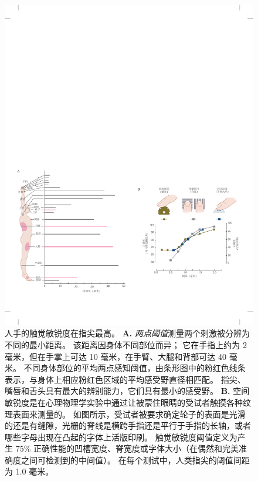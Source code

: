 \begin{figure}[htbp]
	\centering
	\includegraphics[width=1.0\linewidth]{chap19/fig_19_6}
	\caption{人手的触觉敏锐度在指尖最高。
		\textbf{A.} \textit{两点阈值}测量两个刺激被分辨为不同的最小距离。
		该距离因身体不同部位而异；
		它在手指上约为 2 毫米，但在手掌上可达 10 毫米，在手臂、大腿和背部可达 40 毫米。
		不同身体部位的平均两点感知阈值，由条形图中的粉红色线条表示，与身体上相应粉红色区域的平均感受野直径相匹配。
		指尖、嘴唇和舌头具有最大的辨别能力，它们具有最小的感受野\cite{weinstein1968intensive}。
		\textbf{B.} 空间敏锐度是在心理物理学实验中通过让被蒙住眼睛的受试者触摸各种纹理表面来测量的。
		如图所示，受试者被要求确定轮子的表面是光滑的还是有缝隙，光栅的脊线是横跨手指还是平行于手指的长轴，或者哪些字母出现在凸起的字体上活版印刷。
		触觉敏锐度阈值定义为产生 75\% 正确性能的凹槽宽度、脊宽度或字体大小（在偶然和完美准确度之间可检测到的中间值）。
		在每个测试中，人类指尖的阈值间距为 1.0 毫米\cite{johnson1981tactile}。}
	\label{fig:19_6}
\end{figure}


